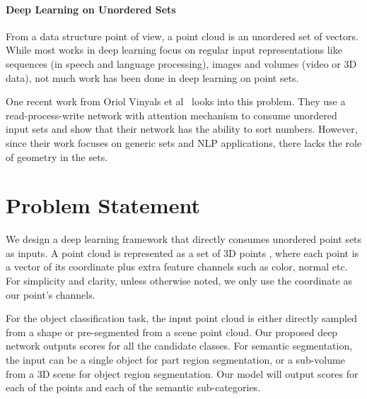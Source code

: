 \documentclass[10pt,twocolumn,letterpaper]{article}
\newcommand{\cmt}[2]{[#1: #2]}
\newcommand{\todo}[1]{\cmt{{\bf TODO}}{{\bf \color{red} #1}}}
\begin{document}
\paragraph{Deep Learning on Unordered Sets}

From a data structure point of view, a point cloud is an unordered set of vectors. While most works in deep learning focus on regular input representations like sequences (in speech and language processing), images and volumes (video or 3D data), not much work has been done in deep learning on point sets.

One recent work from Oriol Vinyals et al~\cite{vinyals2015order} looks into this problem. They use a read-process-write network with attention mechanism to consume unordered input sets and show that their network has the ability to sort numbers. However, since their work focuses on generic sets and NLP applications, there lacks the role of geometry in the sets.

%
 
\section{Problem Statement}
\label{sec:problem}
\begin{comment}
\todo{
  \begin{enumerate}
    \item we are interested in deep learning methods for object classification and segmentation on 3d point sets.
    \item we solve the two problems in a unified framework. in this framework, we use neural network to learn a function  that takes a subset of points in  as input, and predicts the object recognition or per-point segmentation.  
  \end{enumerate}
}
\end{comment}

We design a deep learning framework that directly consumes unordered point sets as inputs. A point cloud is represented as a set of 3D points , where each point  is a vector of its  coordinate plus extra feature channels such as color, normal etc. For simplicity and clarity, unless otherwise noted, we only use the  coordinate as our point's channels. 

For the object classification task, the input point cloud is either directly sampled from a shape or pre-segmented from a scene point cloud. Our proposed deep network outputs  scores for all the  candidate classes.
For semantic segmentation, the input can be a single object for part region segmentation, or a sub-volume from a 3D scene for object region segmentation. Our model will output  scores for each of the  points and each of the  semantic sub-categories.
\end{document}

